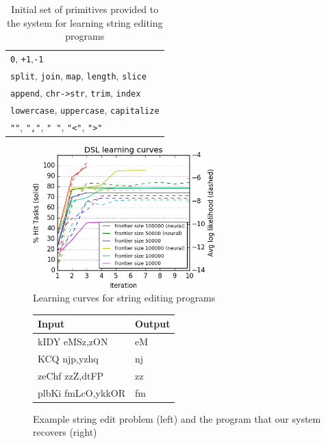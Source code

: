 \documentclass{article}
\begin{document}
\begin{table}
  
  \centering
  \begin{tabular}{l}
  \toprule
    \texttt{0}, \texttt{+1},\texttt{-1}\\
    \texttt{split}, \texttt{join}, \texttt{map}, \texttt{length}, \texttt{slice}\\
    \texttt{append}, \texttt{chr->str}, \texttt{trim}, \texttt{index}\\
    \texttt{lowercase}, \texttt{uppercase}, \texttt{capitalize}\\
    \texttt{""},    \texttt{","},     \texttt{" "},    \texttt{"<"}, \texttt{">"}  
  \\\bottomrule
  \end{tabular}
  \caption{Initial set of primitives provided to the system for learning string editing programs}\label{textPrimitives}
  \end{table}
\begin{figure}

  \includegraphics[width = 7cm]{figures/text.png}
  \caption{Learning curves for string editing programs}\label{textLearningCurve}

\end{figure}

\begin{figure}
  \begin{tabular}{ll}\toprule
    Input&Output\\\midrule
    kIDY eMSz,zON& 	eM\\
KCQ njp,yzhq 	&nj\\
zeChf zzZ,dtFP 	&zz\\
plbKi fmLcO,ykkOR 	&fm    \\\bottomrule
  \end{tabular}
  \caption{Example string edit problem (left) and the program that our system recovers (right)}\label{exampleTextProblem}
  \end{figure}
\end{document}
